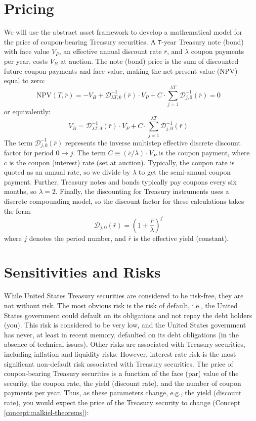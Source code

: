\documentclass[11pt]{article}
\theoremstyle{definition}
\begin{document}
\section*{Pricing}
We will use the abstract asset framework to develop a mathematical model for the price of coupon-bearing Treasury securities.
A \texttt{T}-year Treasury note (bond) with face value $V_{P}$, an effective annual discount rate $\bar{r}$, and $\lambda$ coupon payments per year, costs $V_{B}$ at auction.
The note (bond) price is the sum of discounted future coupon payments and face value, making the net present value (NPV) equal to zero:
\begin{equation}
\text{NPV}(T,\bar{r}) = -V_{B} + \mathcal{D}^{-1}_{\lambda{T},0}(\bar{r})\cdot{V_{P}}+C\cdot\sum_{j=1}^{\lambda{T}}\mathcal{D}_{j,0}^{-1}(\bar{r}) = 0
\end{equation}
or equivalently:
\begin{equation}
V_{B} = \mathcal{D}^{-1}_{\lambda{T},0}(\bar{r})\cdot{V_{P}}+C\cdot\sum_{j=1}^{\lambda{T}}\mathcal{D}_{j,0}^{-1}(\bar{r})
\end{equation}
The term $\mathcal{D}_{j,0}^{-1}(\bar{r})$ represents the inverse multistep effective discrete discount factor for period $0\rightarrow{j}$. 
The term $C\equiv(\bar{c}/\lambda)\cdot{V_{P}}$ is the coupon payment, where $\bar{c}$ is the coupon (interest) rate (set at auction).
Typically, the coupon rate is quoted as an annual rate, so we divide by $\lambda$ to get the semi-annual coupon payment.
Further, Treasury notes and bonds typically pay coupons every six months, so $\lambda=2$.
Finally, the discounting for Treasury instruments uses a discrete compounding model, so the discount factor for these calculations takes the form:
\begin{equation}
\mathcal{D}_{j,0}(\bar{r}) = \left(1+\frac{\bar{r}}{\lambda}\right)^{j}
\end{equation}
where $j$ denotes the period number, and $\bar{r}$ is the effective yield (constant).

\section*{Sensitivities and Risks}
While United States Treasury securities are considered to be risk-free, they are not without risk. The most obvious risk is the risk of default, i.e., the United States government could default on its obligations and not repay the debt holders (you).
This risk is considered to be very low, and the United States government has never, at least in recent memory, defaulted on its debt obligations (in the absence of technical issues). Other risks are associated with Treasury securities, including inflation and liquidity risks.
However, interest rate risk is the most significant non-default risk associated with Treasury securities.
The price of coupon-bearing Treasury securities is a function of the face (par) value of the security, the coupon rate, the yield (discount rate), and the number of coupon payments per year.
Thus, as these parameters change, e.g., the yield (discount rate), you would expect the price of the Treasury security to change (Concept \ref{concept:malkiel-theorems}):
\end{document}
